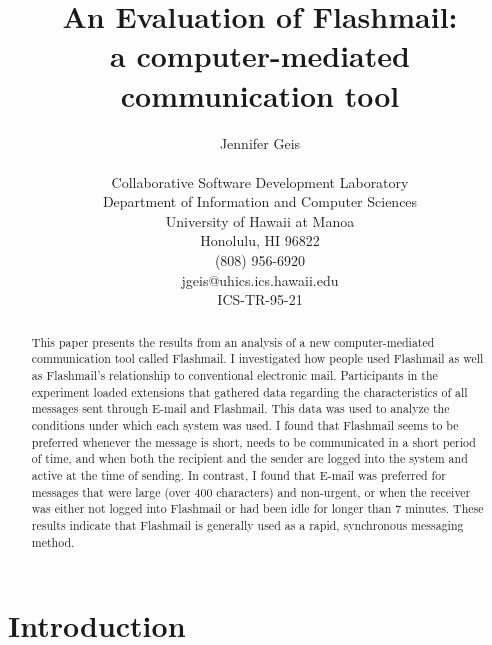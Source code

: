  \pagestyle{headings} \makeindex



\title{An Evaluation of Flashmail: \\ a computer-mediated communication
  tool} \author{Jennifer Geis\\ \\ Collaborative Software Development
  Laboratory\\ Department of Information and Computer Sciences\\ University
  of Hawaii at Manoa\\ Honolulu, HI 96822\\ (808) 956-6920\\ {\sf
    jgeis@uhics.ics.hawaii.edu}\\ {\sf ICS-TR-95-21}}\maketitle

\begin{abstract}
  This paper presents the results from an analysis of a new
  computer-mediated communication tool called Flashmail.  I investigated
  how people used Flashmail as well as Flashmail's relationship to
  conventional electronic mail.  Participants in the experiment loaded
  extensions that gathered data regarding the characteristics of all
  messages sent through E-mail and Flashmail.  This data was used 
  to analyze the conditions under which each system was used.  I found that
  Flashmail seems to be preferred whenever the message is short, needs to
  be communicated in a short period of time, and when both the recipient
  and the sender are logged into the system and active at the time of
  sending.  In contrast, I found that E-mail was preferred for messages
  that were large (over 400 characters) and non-urgent, or when the
  receiver was either not logged into Flashmail or had been idle for longer
  than 7 minutes.  These results indicate that Flashmail is generally used
  as a rapid, synchronous messaging method.
\end{abstract}
\newpage
\tableofcontents
\newpage {}


\section{Introduction}
